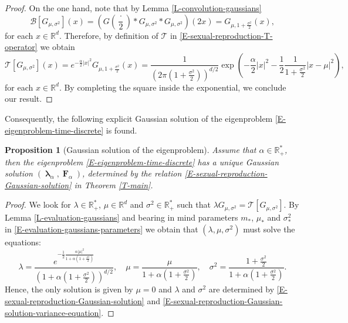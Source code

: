 \documentclass[reqno]{amsart}
\newtheorem{proposition}[definition]{Proposition}
\DeclareMathOperator{\blambda}{\boldsymbol{\lambda}}
\DeclareMathOperator{\bF}{\boldsymbol{F}}
\numberwithin{equation}{section}
\begin{document}
{\begin{proof}
On the one hand, note that by Lemma \ref{L-convolution-gaussians}
$$\mathcal{B}[G_{\mu,\sigma^2}](x)=\left(G\left(\frac{\cdot}{2}\right)*G_{\mu,\sigma^2}*G_{\mu,\sigma^2}\right)(2x)=G_{\mu,1+\frac{\sigma^2}{2}}(x),$$
for each $x\in \mathbb{R}^d$. Therefore, by definition of $\mathcal{T}$ in \eqref{E-sexual-reproduction-T-operator} we obtain
$$\mathcal{T}[G_{\mu,\sigma^2}](x)=e^{-\frac{\alpha}{2}\vert x\vert^2}G_{\mu,1+\frac{\sigma^2}{2}}(x)=\frac{1}{(2\pi (1+\frac{\sigma^2}{2}))^{d/2}}\exp\left(-\frac{\alpha}{2}\vert x\vert^2-\frac{1}{2}\frac{1}{1+\frac{\sigma^2}{2}}\vert x-\mu\vert^2\right),$$
for each $x\in \mathbb{R}^d$. By completing the square inside the exponential, we conclude our result.
\end{proof}

Consequently, the following explicit Gaussian solution of the eigenproblem \eqref{E-eigenproblem-time-discrete} is found.

\begin{proposition}[Gaussian solution of the eigenproblem]\label{P-sexual-reproduction-Gaussian-solution}
Assume that $\alpha\in \mathbb{R}_+^*$, then the eigenproblem \eqref{E-eigenproblem-time-discrete} has a unique Gaussian solution $(\blambda_\alpha,\bF_\alpha)$, determined by the relation \eqref{E-sexual-reproduction-Gaussian-solution} in Theorem \ref{T-main}.
\end{proposition}

\begin{proof}
We look for $\lambda\in\mathbb{R}_+^*$, $\mu\in \mathbb{R}^d$ and $\sigma^2\in\mathbb{R}_+^*$ such that $\lambda G_{\mu,\sigma^2}=\mathcal{T}[G_{\mu,\sigma^2}]$. By Lemma \ref{L-evaluation-gaussians} and bearing in mind parameters $m_*$, $\mu_*$ and $\sigma_*^2$ in \eqref{E-evaluation-gaussians-parameters} we obtain that $(\lambda,\mu,\sigma^2)$ must solve the equations:
$$\lambda=\frac{e^{-\frac{1}{2}\frac{\alpha\vert \mu\vert^2}{1+\alpha(1+\frac{\sigma^2}{2})}}}{(1+\alpha(1+\frac{\sigma^2}{2}))^{d/2}},\quad \mu=\frac{\mu}{1+\alpha(1+\frac{\sigma^2}{2})},\quad \sigma^2=\frac{1+\frac{\sigma^2}{2}}{1+\alpha(1+\frac{\sigma^2}{2})}.$$
Hence, the only solution is given by $\mu=0$ and $\lambda$ and $\sigma^2$ are determined by \eqref{E-sexual-reproduction-Gaussian-solution} and \eqref{E-sexual-reproduction-Gaussian-solution-variance-equation}.
\end{proof}

}
\end{document}
